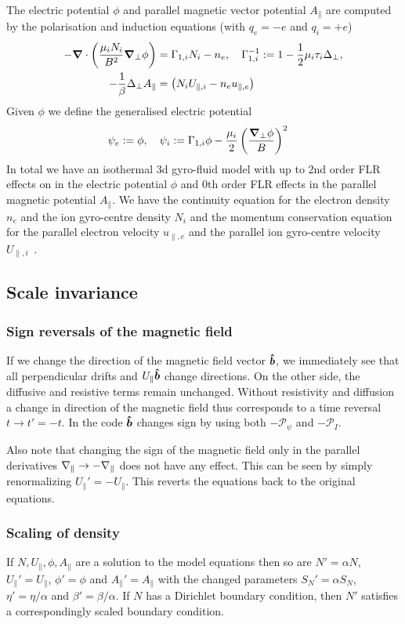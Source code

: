 The electric potential \(\phi\) and parallel magnetic vector potential \(A_\parallel\) are
computed by the polarisation and induction equations (with $q_e=-e$ and $q_i=+e$)
\begin{align}
 -{\boldsymbol{\nabla}}\cdot\left(\frac{\mu_iN_i}{B^2} {\boldsymbol{\nabla}}_{\perp} \phi\right) &=  \Gamma_{1,i} N_i -n_e, \quad \Gamma_{1,i}^{-1} := 1-\frac{1}{2}\mu_i\tau_i\Delta_\perp , \\
  -\frac{1}{\beta} \Delta_\perp A_\parallel &= \left(N_i U_{\parallel,i}-n_e u_{\parallel,e} \right)
  \label{eq:polarisation_dimensional}
\end{align}
Given $\phi$ we define the generalised electric potential
\begin{align}
    \psi_e := \phi,\quad \psi_i&:= \Gamma_{1,i} \phi - \frac{\mu_i }{2}\left(\frac{{\boldsymbol{\nabla}}_{\perp}\phi}{B}\right)^2
\end{align}
In total
we have an isothermal 3d gyro-fluid model with up to 2nd order FLR effects
on in the electric potential $\phi$ and 0th order FLR effects in the parallel magnetic
potential $A_\parallel$.
We have the continuity equation for the electron density \(n_e\) and the ion gyro-centre
density \(N_i\) and the momentum conservation equation for
the parallel electron velocity \(u_{\parallel,e}\) and the parallel ion gyro-centre velocity \(U_{\parallel,i}\)~\cite{WiesenbergerPhD, HeldPhD}.
\subsection{ Scale invariance}
\subsubsection{Sign reversals of the magnetic field}\label{sec:field_reversal}
If we change the direction of the magnetic field vector $\bm{\hat{b}}$, we immediately see that all perpendicular
drifts and $U_\parallel\bm{\hat{b}}$ change directions. On the other side, the diffusive and resistive terms remain unchanged.
Without resistivity and diffusion a change in direction of the magnetic field thus corresponds to
a time reversal $t\rightarrow t'=-t$.
In the code $\bm{\hat{b}}$ changes sign by using both $-\mathcal P_\psi$ and $-\mathcal P_I$.

Also note that changing the sign of the magnetic field only in the parallel derivatives $\nabla_\parallel \rightarrow -\nabla_\parallel$ does not
have any effect. This can be seen by simply renormalizing $U_\parallel'=-U_\parallel$. This reverts the equations back to the original equations.
\subsubsection{Scaling of density}
If $N, U_\parallel, \phi, A_\parallel$ are a solution to the model equations
then so are $N'=\alpha N$, $U_\parallel'=U_\parallel$, $\phi'=\phi$ and $A_\parallel'=A_\parallel$ with the changed parameters $S_N' = \alpha S_N$, $\eta' = \eta/\alpha$ and $ \beta' = \beta/\alpha$. If $N$
has a Dirichlet boundary condition, then $N'$ satisfies a correspondingly scaled boundary condition.


